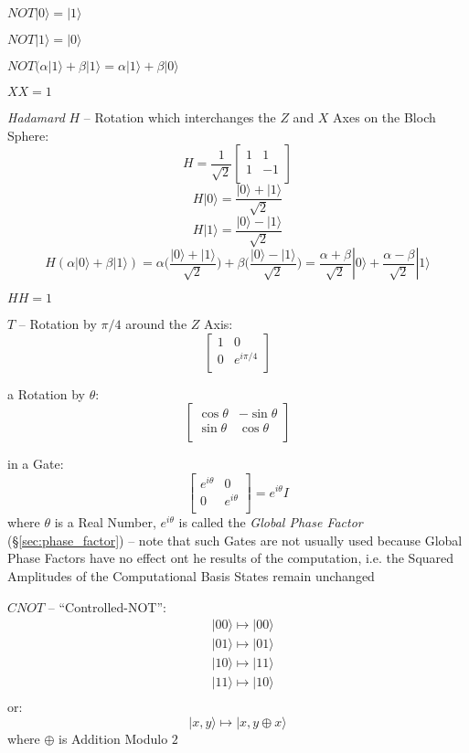 $NOT|0\rangle = |1\rangle$

$NOT|1\rangle = |0\rangle$

$NOT(\alpha|1\rangle + \beta|1\rangle = \alpha|1\rangle + \beta|0\rangle$

$X X = 1$

\emph{Hadamard} $H$ -- Rotation which interchanges the $Z$ and $X$ Axes on the
Bloch Sphere:
\[
  H = \frac{1}{\sqrt 2}\begin{bmatrix}
    1 &  1 \\
    1 & -1 \\
  \end{bmatrix}
\]
\[
  H|0\rangle = \frac{|0\rangle + |1\rangle}{\sqrt{2}}
\]
\[
  H|1\rangle = \frac{|0\rangle - |1\rangle}{\sqrt{2}}
\]
\[
  H(\alpha|0\rangle + \beta|1\rangle) =
    \alpha\Big(\frac{|0\rangle + |1\rangle}{\sqrt 2}\Big) +
    \beta\Big(\frac{|0\rangle - |1\rangle}{\sqrt 2}\Big)
    = \frac{\alpha + \beta}{\sqrt 2}|0\rangle +
      \frac{\alpha - \beta}{\sqrt 2}|1\rangle
\]

$H H = 1$

$T$ -- Rotation by $\pi/4$ around the $Z$ Axis:
\[
  \begin{bmatrix}
    1 & 0 \\
    0 & e^{i\pi/4} \\
  \end{bmatrix}
\]

a Rotation by $\theta$:
\[
  \begin{bmatrix}
    \cos \theta & -\sin \theta \\
    \sin \theta &  \cos \theta \\
  \end{bmatrix}
\]

in a Gate:
\[
  \begin{bmatrix}
    e^{i\theta} & 0           \\
    0           & e^{i\theta} \\
  \end{bmatrix} = e^{i\theta}I
\]
where $\theta$ is a Real Number, $e^{i\theta}$ is called the \emph{Global Phase
  Factor} (\S\ref{sec:phase_factor}) -- note that such Gates are not usually
used because Global Phase Factors have no effect ont he results of the
computation, i.e. the Squared Amplitudes of the Computational Basis States
remain unchanged

$CNOT$ -- ``Controlled-NOT'':
\begin{align*}
  & |00\rangle \mapsto |00\rangle \\
  & |01\rangle \mapsto |01\rangle \\
  & |10\rangle \mapsto |11\rangle \\
  & |11\rangle \mapsto |10\rangle \\
\end{align*}
or:
\[
  |x,y\rangle \mapsto |x, y \oplus x\rangle
\]
where $\oplus$ is Addition Modulo $2$


